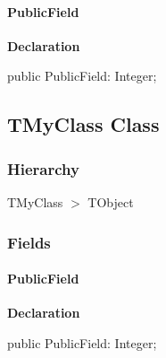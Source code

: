 \documentclass{report}
\begin{document}
\paragraph*{PublicField}\hspace*{\fill}

\begin{list}{}{
\setlength{\itemindent}{0cm}
\setlength{\listparindent}{0cm}
\setlength{\leftmargin}{\evensidemargin}
\addtolength{\leftmargin}{\tmplength}
\settowidth{\labelsep}{X}
\addtolength{\leftmargin}{\labelsep}
\setlength{\labelwidth}{\tmplength}
}
\begin{flushleft}
\item[\textbf{Declaration}\hfill]
\begin{ttfamily}
public PublicField: Integer;\end{ttfamily}


\end{flushleft}
\end{list}
\subsection*{TMyClass Class}
\subsubsection*{\large{\textbf{Hierarchy}}\normalsize\hspace{1ex}\hfill}
TMyClass {$>$} TObject
\subsubsection*{\large{\textbf{Fields}}\normalsize\hspace{1ex}\hfill}
\paragraph*{PublicField}\hspace*{\fill}

\begin{list}{}{
\setlength{\itemindent}{0cm}
\setlength{\listparindent}{0cm}
\setlength{\leftmargin}{\evensidemargin}
\addtolength{\leftmargin}{\tmplength}
\settowidth{\labelsep}{X}
\addtolength{\leftmargin}{\labelsep}
\setlength{\labelwidth}{\tmplength}
}
\begin{flushleft}
\item[\textbf{Declaration}\hfill]
\begin{ttfamily}
public PublicField: Integer;\end{ttfamily}


\end{flushleft}
\end{list}
\end{document}
